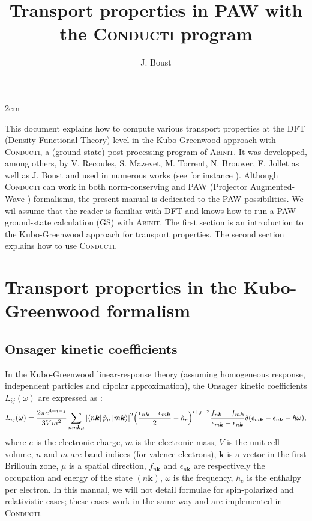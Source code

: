 \documentclass[a4,12pts]{extarticle}
\title{Transport properties in PAW with the \textsc{Conducti} program}
\author{J. Boust}
\begin{document}
\maketitle
{}%
\emergencystretch 2em%

 This document explains how to compute various transport properties at the DFT (Density Functional Theory) level in the Kubo-Greenwood approach with \textsc{Conducti}, a (ground-state) post-processing program of \textsc{Abinit}. It was developped, among others, by V. Recoules, S. Mazevet, M. Torrent, N. Brouwer, F. Jollet as well as J. Boust and used in numerous works (see for instance \cite{Mazevet2010,Jourdain2020,Brouwer2021}).
Although \textsc{Conducti} can work in both norm-conserving and PAW (Projector Augmented-Wave \cite{Bloechl1994}) formalisms, the present manual is dedicated to the PAW possibilities.
We wil assume that the reader is familiar with DFT and knows how to run a PAW ground-state calculation (GS) with \textsc{Abinit}.
The first section is an introduction to the Kubo-Greenwood approach for transport properties.
The second section explains how to use \textsc{Conducti}.



\section{Transport properties in the Kubo-Greenwood formalism}

\subsection{Onsager kinetic coefficients} \label{Onsager}

In the Kubo-Greenwood \cite{Kubo1957,Greenwood1958} linear-response theory (assuming homogeneous response, independent particles and dipolar approximation), the Onsager kinetic coefficients $L_{ij}(\omega)$ are expressed as \cite{Holst2011}:
\begin{align}
L_{ij}(\omega)=\frac{2\pi e^{4-i-j}}{3Vm^2}\sum_{nm\boldsymbol{k}\mu}\abs{\bra{n\boldsymbol{k}}\hat{p}_{\mu}\ket{m\boldsymbol{k}}}^{2}
\Big(\frac{\epsilon_{n\boldsymbol{k}}+\epsilon_{m\boldsymbol{k}}}{2}-h_e\Big)^{i+j-2}\frac{f_{n\boldsymbol{k}}-f_{m\boldsymbol{k}}}{\epsilon_{m\boldsymbol{k}}-\epsilon_{n\boldsymbol{k}}}\delta(\epsilon_{m\boldsymbol{k}}-\epsilon_{n\boldsymbol{k}}-\hbar\omega), \label{Lij}
\end{align}
where $e$ is the electronic charge, $m$ is the electronic mass, $V$ is the unit cell volume, $n$ and $m$ are band indices (for valence electrons), $\boldsymbol{k}$ is a vector in the first Brillouin zone, $\mu$ is a spatial direction, $f_{n\boldsymbol{k}}$ and $\epsilon_{n\boldsymbol{k}}$ are respectively the occupation and energy of the state $(n\boldsymbol{k})$, $\omega$ is the frequency, $h_e$ is the enthalpy per electron. In this manual, we will not detail formulae for spin-polarized and relativistic cases; these cases work in the same way and are implemented in \textsc{Conducti}.\\
\end{document}
